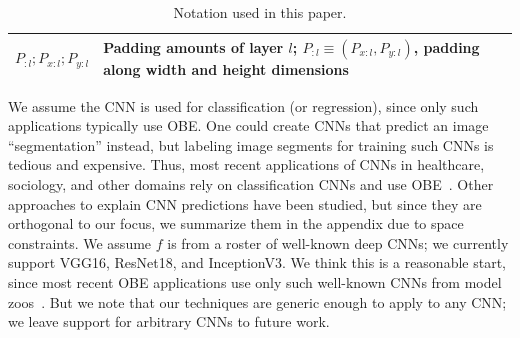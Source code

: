 \begin{table}[t]
{\begin{tabular}{p{2cm}p{7.5cm}}
    \midrule
    $P_{:l}; P_{x:l}; P_{y:l}$ & Padding amounts of layer $l$; $P_{:l} \equiv (P_{x:l}, P_{y:l})$, padding along width and height dimensions\\
    \bottomrule
  \end{tabular}}
    \caption{Notation used in this paper.}
\label{table:preliminaries_symbols}
\vspace{-8mm}
\end{table}

We assume the CNN is used for classification (or regression), since only such applications typically use OBE. One could create CNNs that predict an image ``segmentation'' instead, but labeling image segments for training such CNNs is tedious and expensive. Thus, most recent applications of CNNs in healthcare, sociology, and other domains rely on classification CNNs and use OBE~\cite{kermany2018identifying, islam2017abnormality, mohanty2016using, arbabzadah2016identifying, wang2017deep}. Other approaches to explain CNN predictions have been studied, but since they are orthogonal to our focus, we summarize them in the appendix due to space constraints.
We assume $f$ is from a roster of well-known deep CNNs; we currently support VGG16, ResNet18, and InceptionV3. We think this is a reasonable start, since most recent OBE applications use only such well-known CNNs from model zoos~\cite{caffemodelzoo, tfmodelzoo}. But we note that our techniques are generic enough to apply to any CNN; we leave support for arbitrary CNNs to future work.

